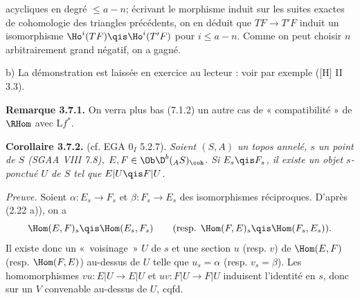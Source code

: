 acycliques en degré \(\leq a-n\); écrivant le morphisme induit sur les suites exactes de cohomologie des triangles précédents, on en déduit que \(TF\to T'F\) induit un isomorphisme \(\Ho^i(TF)\qis\Ho^i(T'F)\) pour \(i\leq a-n\). Comme on peut choisir \(n\) arbitrairement grand négatif, on a gagné.

b) La démonstration est laissée en exercice au lecteur : voir par exemple ([H] II 3.3).

\textbf{Remarque 3.7.1.} On verra plus bas (7.1.2) un autre cas de « compatibilité » de \(\RHom\) avec \(\mathrm Lf^*\).

\textbf{Corollaire 3.7.2.} (cf. EGA \(0_I\) 5.2.7). \emph{Soient \((S,A)\) un topos annelé, \(s\) un point de \(S\) (SGAA VIII 7.8), \(E,F\in\Ob\D^b(_A S)_{\coh}\). Si \(E_s\qis F_s\), il existe un objet \(s\)-ponctué \(U\) de \(S\) tel que \(E|U\qis F|U\).}

\emph{Preuve.} Soient \(\alpha:E_s\to F_s\) et \(\beta:F_s\to E_s\) des isomorphismes réciproques. D'après (2.22 a)), on a
\[
  \Hom(E,F)_s\qis\Hom(E_s,F_s)
  \qquad
  (\text{resp. }\Hom(F,E)_s\qis\Hom(F_s,E_s)).
\]
Il existe donc un «~voisinage~» \(U\) de \(s\) et une section \(u\) (resp. \(v\)) de \(\Hom(E,F)\) (resp. \(\Hom(F,E)\)) au-dessus de \(U\) telle que \(u_s=\alpha\) (resp. \(v_s=\beta\)). Les homomorphismes \(vu:E|U\to E|U\) et \(uv:F|U\to F|U\) induisent l'identité en \(s\), donc sur un \(V\) convenable au-dessus de \(U\), cqfd.


